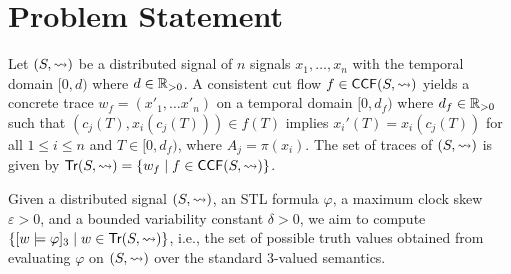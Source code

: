 \section{Problem Statement}
Let $(S,{\rightsquigarrow})$ be a distributed signal of $n$ signals $x_1, \ldots, x_n$ with the temporal domain $[0,d)$ where $d \in \mathbb{R}_{> 0}$.
A consistent cut flow $f \in \mathsf{CCF}(S,{\rightsquigarrow})$ yields a concrete trace $w_f = (x'_1, \ldots x'_n)$ on a temporal domain $[0,d_f)$ where $d_f \in \mathbb{R}_{> 0}$ such that $(c_j(T), x_i(c_j(T))) \in f(T)$ implies $x_i'(T) = x_i(c_j(T))$ for all $1 \leq i \leq n$ and $T \in [0, d_f)$, where $A_j = \pi(x_i)$.
The set of traces of $(S,{\rightsquigarrow})$ is given by $\tr(S,{\hb}) = \{ w_f \st f \in \CCF(S,{\hb})\}$.

Given a distributed signal $(S, {\rightsquigarrow})$, an STL formula $\varphi$, a maximum clock skew $\varepsilon > 0$, and a bounded variability constant $\delta > 0$, we aim to compute $\{ [w \models \varphi]_3 \st w \in \tr(S, {\hb}) \}$, i.e., the set of possible truth values obtained from evaluating $\varphi$ on $(S, {\rightsquigarrow})$ over the standard 3-valued semantics.